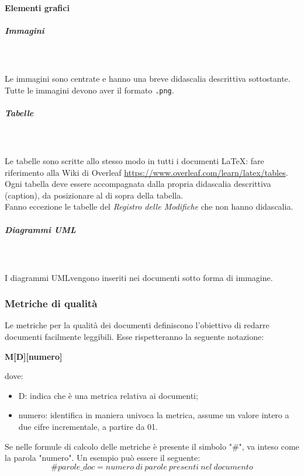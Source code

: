 \paragraph{Elementi grafici}
\subparagraph*{Immagini}\mbox{} \\ \mbox{} \\
Le immagini sono centrate e hanno una breve didascalia descrittiva sottostante. Tutte le immagini devono aver il formato \texttt{.png}\glo.

\subparagraph*{Tabelle}\mbox{} \\ \mbox{} \\
Le tabelle sono scritte allo stesso modo in tutti i documenti \LaTeX{}: fare riferimento alla Wiki di Overleaf \url{https://www.overleaf.com/learn/latex/tables}. \\
Ogni tabella deve essere accompagnata dalla propria didascalia descrittiva (caption), da posizionare al di sopra della tabella. \\
Fanno eccezione le tabelle del \textit{Registro delle Modifiche} che non hanno didascalia.

\subparagraph*{Diagrammi UML}\mbox{} \\ \mbox{} \\
I diagrammi UML\glo vengono inseriti nei documenti sotto forma di immagine.

\subsubsection{Metriche di qualità}
Le metriche per la qualità dei documenti definiscono l’obiettivo di redarre documenti facilmente leggibili. Esse rispetteranno la seguente notazione: \\
\centerline{\textbf{M[D][numero]}}
dove: \begin{itemize}
\item D: indica che è una metrica relativa ai documenti;
\item numero: identifica in maniera univoca la metrica, assume un valore intero a due cifre incrementale, a partire da 01.
\end{itemize}
Se nelle formule di calcolo delle metriche è presente il simbolo "\#", va inteso come la parola "numero". Un esempio può essere il seguente:
\[ \#parole\_doc = numero\ di\ parole\ presenti\ nel\ documento \]


